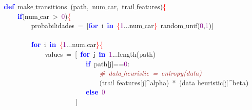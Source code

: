 \noindent
\mbox{}\textbf{\textcolor{Blue}{def}}\ make$\_$transitions\ \textcolor{BrickRed}{(}path\textcolor{BrickRed}{,}\ num$\_$car\textcolor{BrickRed}{,}\ trail$\_$features\textcolor{BrickRed}{)}\textcolor{Red}{\{} \\
\mbox{}\ \ \ \ \textbf{\textcolor{Blue}{if}}\textcolor{BrickRed}{(}num$\_$car\ \textcolor{BrickRed}{\textgreater{}}\ \textcolor{Purple}{0}\textcolor{BrickRed}{)}\textcolor{Red}{\{} \\
\mbox{}\ \ \ \ \ \ \ \ probabilidades\ \textcolor{BrickRed}{=}\ \textcolor{BrickRed}{[}\textbf{\textcolor{Blue}{for}}\ i\ \textbf{\textcolor{Blue}{in}}\ \textcolor{Red}{\{}\textcolor{Purple}{1}\textcolor{BrickRed}{...}num$\_$car\textcolor{Red}{\}}\ random$\_$unif\textcolor{BrickRed}{(}\textcolor{Purple}{0}\textcolor{BrickRed}{,}\textcolor{Purple}{1}\textcolor{BrickRed}{)]} \\
\mbox{} \\
\mbox{}\ \ \ \ \ \ \ \ \textbf{\textcolor{Blue}{for}}\ i\ \textbf{\textcolor{Blue}{in}}\ \textcolor{Red}{\{}\textcolor{Purple}{1}\textcolor{BrickRed}{...}num\textcolor{BrickRed}{.}car\textcolor{Red}{\}\{} \\
\mbox{}\ \ \ \ \ \ \ \ \ \ \ \ values\ \textcolor{BrickRed}{=}\ \textcolor{BrickRed}{[}\ \textbf{\textcolor{Blue}{for}}\ j\ \textbf{\textcolor{Blue}{in}}\ \textcolor{Purple}{1}\textcolor{BrickRed}{...}length\textcolor{BrickRed}{(}path\textcolor{BrickRed}{)} \\
\mbox{}\ \ \ \ \ \ \ \ \ \ \ \ \ \ \ \ \ \ \ \ \ \ \ \ \textbf{\textcolor{Blue}{if}}\ path\textcolor{BrickRed}{[}j\textcolor{BrickRed}{]==}\textcolor{Purple}{0}\textcolor{BrickRed}{:} \\
\mbox{}\ \ \ \ \ \ \ \ \ \ \ \ \ \ \ \ \ \ \ \ \ \ \ \ \ \ \ \ \textit{\textcolor{Brown}{\#\ data$\_$heuristic\ =\ entropy(data)}} \\
\mbox{}\ \ \ \ \ \ \ \ \ \ \ \ \ \ \ \ \ \ \ \ \ \ \ \ \ \ \ \ \textcolor{BrickRed}{(}trail$\_$features\textcolor{BrickRed}{[}j\textcolor{BrickRed}{]\textasciicircum{}}alpha\textcolor{BrickRed}{)}\ \textcolor{BrickRed}{*}\ \textcolor{BrickRed}{(}data$\_$heuristic\textcolor{BrickRed}{[}j\textcolor{BrickRed}{]\textasciicircum{}}beta\textcolor{BrickRed}{)} \\
\mbox{}\ \ \ \ \ \ \ \ \ \ \ \ \ \ \ \ \ \ \ \ \ \ \ \ \textbf{\textcolor{Blue}{else}}\ \textcolor{Purple}{0} \\
\mbox{}\ \ \ \ \ \ \ \ \ \ \ \ \ \ \ \ \ \ \ \ \ \textcolor{BrickRed}{]} \\
